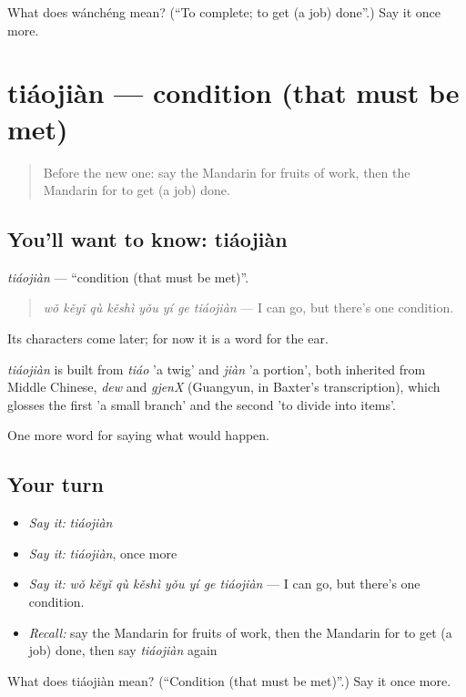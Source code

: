 \begin{tcolorbox}[breakable,colback=teal!4,colframe=teal!35!black,title={Before you move on}]
What does wánchéng mean? (\textquotedblleft{}To complete; to get (a job) done\textquotedblright{}.) Say it once more.
\end{tcolorbox}
\section[tiáojiàn]{tiáojiàn — condition (that must be met)}

\label{lesson:ZH-C395-tiaojian}



\begin{quote}
Before the new one: say the Mandarin for fruits of work, then the Mandarin for to get (a job) done.
\end{quote}

\subsection*{You'll want to know: tiáojiàn}
\emph{tiáojiàn} — \textquotedblleft{}condition (that must be met)\textquotedblright{}.

\begin{quote}
\emph{wǒ kěyǐ qù kěshì yǒu yí ge tiáojiàn} — I can go, but there's one condition.
\end{quote}

Its characters come later; for now it is a word for the ear.

\begin{cousinweb}
\emph{tiáojiàn} is built from \emph{tiáo} 'a twig' and \emph{jiàn} 'a portion', both inherited from Middle Chinese, \emph{dew} and \emph{gjenX} (Guangyun, in Baxter's transcription), which glosses the first 'a small branch' and the second 'to divide into items'.
\end{cousinweb}

\begin{grammarlens}[title={What you've built}]
One more word for saying what would happen.
\end{grammarlens}

\subsection*{Your turn}
\begin{itemize}
\raggedright
  \item \emph{Say it:} \emph{tiáojiàn}
  \item \emph{Say it:} \emph{tiáojiàn}, once more
  \item \emph{Say it:} \emph{wǒ kěyǐ qù kěshì yǒu yí ge tiáojiàn} — I can go, but there's one condition.
  \item \emph{Recall:} say the Mandarin for fruits of work, then the Mandarin for to get (a job) done, then say \emph{tiáojiàn} again
\end{itemize}

\begin{tcolorbox}[breakable,colback=teal!4,colframe=teal!35!black,title={Before you move on}]
What does tiáojiàn mean? (\textquotedblleft{}Condition (that must be met)\textquotedblright{}.) Say it once more.
\end{tcolorbox}
